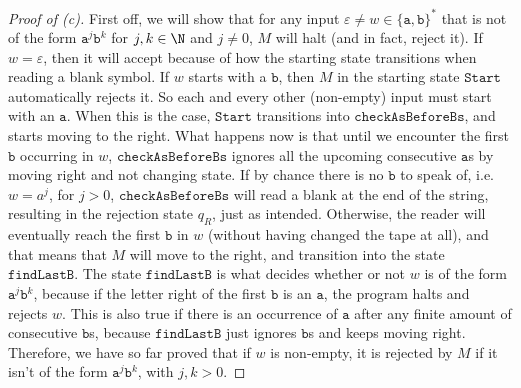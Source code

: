 \documentclass[11pt,a4paper]{article}
\begin{document}
\begin{proof}[Proof of (c)]
 First off, we will show that for any input $\varepsilon \neq w \in
\{\texttt{a},\texttt{b}\}^{*}$ that is not of the form $\texttt{a}^{j}
\texttt{b}^{k}$ for $j, k \in \N$ and $j \neq 0$, $M$ will halt (and in fact, reject it). If $w
=\varepsilon$, then it will accept because of how the starting state
transitions when reading a blank symbol. If $w$ starts with a $\texttt{b}$,
then $M$ in the starting state $\texttt{Start}$ automatically rejects it.
 So each and every other (non-empty) input must start with an $\texttt{a}$. When this is the case,
$\texttt{Start}$ transitions into $\texttt{checkAsBeforeBs}$, and starts moving
to the right. What happens now is that until we encounter the first
$\texttt{b}$ occurring in $w$, $\texttt{checkAsBeforeBs}$ ignores all the
upcoming consecutive $\texttt{a}$s by moving right and not changing state. If
by chance there is no $\texttt{b}$ to speak of, i.e. $w = a^{j}$, for $j >0$,
 $\texttt{checkAsBeforeBs}$ will read a blank at the end of the string,
resulting in the rejection state $q_{R}$, just as intended. Otherwise, the
reader will eventually reach the first $\texttt{b}$ in $w$ (without having
changed the tape at all), and that means that $M$ will move to the right, and
transition into the state $\texttt{findLastB}$. The state $\texttt{findLastB}$
is what decides whether or not $w$ is of the form $\texttt{a}^{j} \texttt{b}^{k}$,
because if the letter right of the first $\texttt{b}$ is an $\texttt{a}$, the program halts and rejects $w$. This is also true if there is an occurrence of $\texttt{a}$ 
after any finite amount of consecutive  $\texttt{b}$s, because $\texttt{findLastB}$ just ignores $\texttt{b}$s and keeps moving right. Therefore, we have so far
proved that if $w$ is non-empty, it is rejected by $M$ if it isn't of the form $\texttt{a}^{j}\texttt{b}^{k}$, with $j,k > 0$.


\end{proof}
\end{document}
